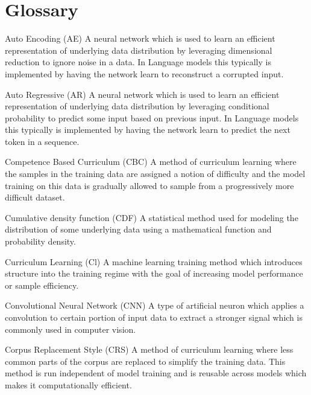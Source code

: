 \documentclass [11pt, proquest] {uwthesis}[2020/12/20]
\begin{document}
\chapter*{Glossary}   
\begin{glossary}
\item[Auto Encoding (AE)] A neural network which is used to learn an efficient representation of underlying data distribution by leveraging dimensional reduction to ignore noise in a data. In Language models this typically is implemented by having the network learn to reconstruct a corrupted input.
\item[Auto Regressive (AR)] A neural network which is used to learn an efficient representation of underlying data distribution by leveraging conditional probability to predict some input based on previous input. In Language models this typically is implemented by having the network learn to predict the next token in a sequence.
\item[Competence Based Curriculum (CBC)] A method of curriculum learning where the samples in the training data are assigned a notion of difficulty and the model training on this data is gradually allowed to sample from a progressively more difficult dataset.
\item[Cumulative density function (CDF)] A statistical method used for modeling the distribution of some underlying data using a mathematical function and probability density.
\item[Curriculum Learning (Cl)] A machine learning training method which introduces structure into the training regime with the goal of increasing model performance or sample efficiency.
\item[Convolutional Neural Network (CNN)] A type of artificial neuron which applies a convolution to certain portion of input data to extract a stronger signal which is commonly used in computer vision.
\item[Corpus Replacement Style (CRS)] A method of curriculum learning where less common parts of the corpus are replaced to simplify the training data. This method is run independent of model training and is reusable across models which makes it computationally efficient.


\end{glossary}
\end{document}
